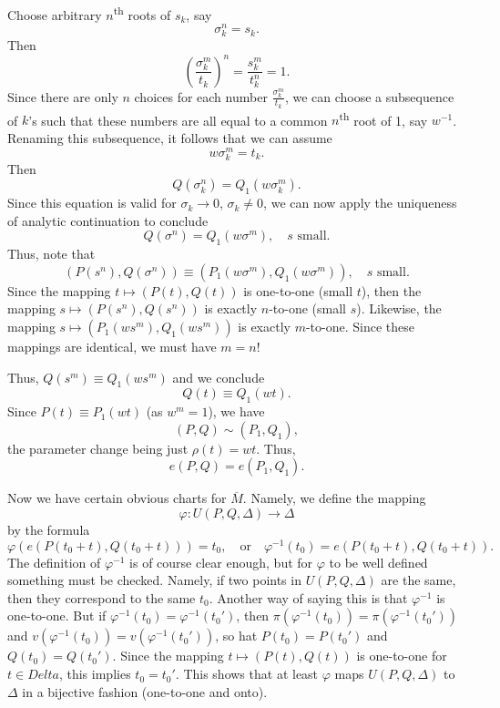 \documentclass[a4paper,11pt]{article}
\begin{document}
\begin{mdframed}
  Choose arbitrary $n$\textsuperscript{th} roots of $s_k$, say
  $$
  \sigma_k^n = s_k.
  $$
  Then
  $$
  \left(\frac{\sigma_k^m}{t_k}\right)^n
  = \frac{s_k^m}{t_k^n}  = 1.
  $$
  Since there are only $n$ choices for each number $\frac{\sigma_k^m}{
    t_k}$, we can choose a subsequence of $k$'s such that these
  numbers are all equal to a common $n$\textsuperscript{th} root of 1,
  say $w^{-1}$.  Renaming this subsequence, it follows that we can
  assume 
  $$
  w \sigma_k^m = t_k.
  $$
  Then
  $$
  Q(\sigma_k^n) = Q_1(w\sigma_k^m).
  $$
  Since this equation is valid for $\sigma_k \to 0$, $\sigma_k \ne 0$,
  we can now apply the uniqueness of analytic continuation to conclude
  $$
  Q(\sigma^n) = Q_1(w\sigma^m),\quad s\text{ small}.
  $$
  Thus, note that
  $$
  (P(s^n), Q(\sigma^n)) \equiv 
  (P_1(w\sigma^m), Q_1(w\sigma^m)),\quad s\text{ small}.
  $$
  Since the mapping $t \mapsto (P(t), Q(t))$ is one-to-one (small
  $t$), then the mapping $s \mapsto (P(s^n), Q(s^n))$ is exactly
  $n$-to-one (small $s$).  Likewise, the mapping $s \mapsto (P_1(w
  s^m), Q_1(ws^m))$ is exactly $m$-to-one.  Since these mappings are
  identical, we must have $m = n$!

  Thus, $Q(s^m) \equiv Q_1(ws^m)$ and we conclude
  $$
  Q(t) \equiv Q_1(wt).
  $$
  Since $P(t) \equiv P_1(wt)$ (as $w^m = 1$), we have
  $$
  (P, Q) \sim (P_1, Q_1),
  $$
  the parameter change being just $\rho(t) = wt$.  Thus,
  $$
  e(P, Q) = e(P_1, Q_1).
  $$
\end{mdframed}


Now we have certain obvious charts for $\overline{M}$.  Namely, we
define the mapping
$$
\varphi : U(P,Q,\Delta) \to \Delta
$$
by the formula
$$
\varphi(e(P(t_0 + t), Q(t_0 + t))) = t_0,
\quad\text{or}\quad
\varphi^{-1}(t_0) = e(P(t_0 + t), Q(t_0 + t)).
$$
The definition of $\varphi^{-1}$ is of course clear enough, but for
$\varphi$ to be well defined something must be checked.  Namely, if
two points in $U(P,Q,\Delta)$ are the same, then they correspond to
the same $t_0$.  Another way of saying this is that $\varphi^{-1}$ is
one-to-one.  But if $\varphi^{-1}(t_0) = \varphi^{-1}(t_0')$, then
$\pi(\varphi^{-1}(t_0)) = \pi(\varphi^{-1}(t_0'))$ and
$v(\varphi^{-1}(t_0)) = v(\varphi^{-1}(t_0'))$, so hat $P(t_0) =
P(t_0')$ and $Q(t_0) = Q(t_0')$.  Since the mapping $t \mapsto (P(t),
Q(t))$ is one-to-one for $t \in Delta$, this implies $t_0 = t_0'$.
This shows that at least $\varphi$ maps $U(P,Q,\Delta)$ to $\Delta$ in
a bijective fashion (one-to-one and onto).
\end{document}
